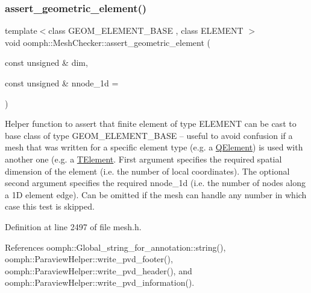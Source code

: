 \subsubsection{\texorpdfstring{assert\+\_\+geometric\+\_\+element()}{assert\_geometric\_element()}}
{\footnotesize\ttfamily template$<$class G\+E\+O\+M\+\_\+\+E\+L\+E\+M\+E\+N\+T\+\_\+\+B\+A\+SE , class E\+L\+E\+M\+E\+NT $>$ \\
void oomph\+::\+Mesh\+Checker\+::assert\+\_\+geometric\+\_\+element (\begin{DoxyParamCaption}\item[{const unsigned \&}]{dim,  }\item[{const unsigned \&}]{nnode\+\_\+1d = {} }\end{DoxyParamCaption})}



Helper function to assert that finite element of type E\+L\+E\+M\+E\+NT can be cast to base class of type G\+E\+O\+M\+\_\+\+E\+L\+E\+M\+E\+N\+T\+\_\+\+B\+A\+SE -- useful to avoid confusion if a mesh that was written for a specific element type (e.\+g. a \hyperlink{classoomph_1_1QElement}{Q\+Element}) is used with another one (e.\+g. a \hyperlink{classoomph_1_1TElement}{T\+Element}. First argument specifies the required spatial dimension of the element (i.\+e. the number of local coordinates). The optional second argument specifies the required nnode\+\_\+1d (i.\+e. the number of nodes along a 1D element edge). Can be omitted if the mesh can handle any number in which case this test is skipped. 



Definition at line 2497 of file mesh.\+h.



References oomph\+::\+Global\+\_\+string\+\_\+for\+\_\+annotation\+::string(), oomph\+::\+Paraview\+Helper\+::write\+\_\+pvd\+\_\+footer(), oomph\+::\+Paraview\+Helper\+::write\+\_\+pvd\+\_\+header(), and oomph\+::\+Paraview\+Helper\+::write\+\_\+pvd\+\_\+information().


